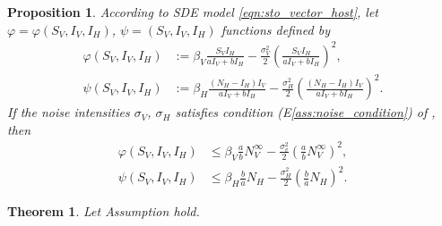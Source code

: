 \documentclass{amsart}
\theoremstyle{plain}
\newtheorem{theorem}{Theorem}
\newtheorem{proposition}{Proposition}
\theoremstyle{definition}
\begin{document}
        \begin{proposition}
            According to SDE model \eqref{eqn:sto_vector_host},
            let $\varphi = \varphi (S_V, I_V, I_H)$, $\psi = (S_V, I_V, I_H)$ 
            functions defined by
            \begin{equation}
                \begin{aligned}
                    \varphi (S_V, I_V, I_H) &:= 
                        \beta_V \frac{S_V I_H}{a I_V + b I_H}
                        - 
                        \frac{\sigma_V ^ 2}{2} 
                        \left(
                            \frac{S_V I_H}{a I_V + b I_H}
                        \right) ^2,
                    \\
                    \psi (S_V, I_V, I_H) &:=
                    \beta_H \frac{(N_H - I_H)  I_V}{a I_V + b I_H}
                        - 
                        \frac{\sigma_H ^ 2}{2} 
                        \left(
                            \frac{(N_H - I_H)  I_V}{a I_V + b I_H}
                        \right) ^2.
                \end{aligned}
            \end{equation}
            If the noise intensities $\sigma_V$, $\sigma_H$ satisfies condition 
            (E\textendash\ref{ass:noise_condition})
            of , then
            \begin{equation}
                \begin{aligned}
                  \varphi (S_V, I_V, I_H) & \leq \beta_V \frac{a}{b} N_V ^ 
                  {\infty}
                 - \frac{\sigma_v ^ 2}{2}
                  \left(
                          \frac{a}{b} N_V ^ {\infty}
                      \right) ^ 2,
                  \\
                  \psi (S_V, I_V, I_H) & \leq
                      \beta_H \frac{b}{a} N_H - \frac{\sigma_H ^ 2}{2}
                      \left(
                          \frac{b}{a} N_H
                      \right) ^ 2 .
                \end{aligned}
            \end{equation}
        \end{proposition}
%
%
        

%
%
%
%
        \begin{theorem}
            Let Assumption hold.
        \end{theorem}
%
%
\end{document}
